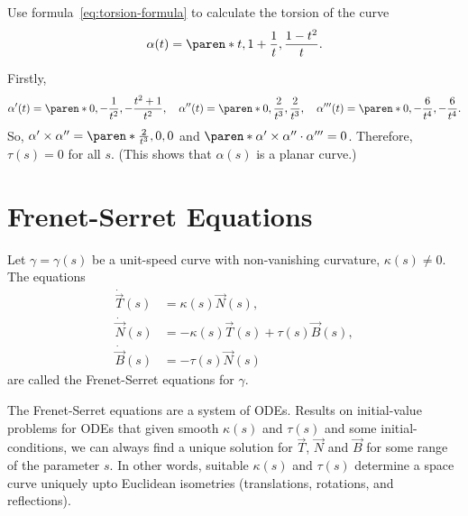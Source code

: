 \documentclass[11pt]{penrose}
\newcommand{\vT}{\vec{T}}
\newcommand{\vN}{\vec{N}}
\newcommand{\vB}{\vec{B}}
\newcommand{\keyword}[1]{\textsf{#1}}
\begin{document}
\begin{negg}
    Use formula~\eqref{eq:torsion-formula} to calculate the torsion of the curve
    \begin{equation}
        \alpha(t)
        = \paren*{ t, 1 + \frac{1}{t}, \frac{1 - t^2}{t} }.
    \end{equation}

    Firstly,
    \begin{equation}
        \alpha'(t) = \paren*{0, -\frac{1}{t^2}, -\frac{t^2 + 1}{t^2}}, \quad
        \alpha''(t) = \paren*{0, \frac{2}{t^3}, \frac{2}{t^3}}, \quad
        \alpha'''(t) = \paren*{0, -\frac{6}{t^4}, -\frac{6}{t^4}}.
    \end{equation}
    So, $\alpha' \times \alpha'' = \paren*{\frac{2}{t^3}, 0, 0}$ and $\paren*{\alpha' \times \alpha''} \cdot \alpha''' = 0$. Therefore, $\tau(s) = 0$ for all $s$. (This shows that $\alpha(s)$ is a planar curve.)
\end{negg}


\section{Frenet-Serret Equations}

\begin{ndfn}
    Let $\gamma = \gamma(s)$ be a unit-speed curve with non-vanishing curvature, $\kappa(s) \neq 0$. The equations
    \begin{align}
        \dot{\vT}(s) &= \kappa(s) \vN(s),\\
        \dot{\vN}(s) &= -\kappa(s) \vT(s) + \tau(s) \vB(s),\\
        \dot{\vB}(s) &= -\tau(s) \vN(s)
    \end{align}
    are called the \keyword{Frenet-Serret equations} for $\gamma$.
\end{ndfn}

The Frenet-Serret equations are a system of ODEs. Results on initial-value problems for ODEs that given smooth $\kappa(s)$ and $\tau(s)$ and some initial-conditions, we can always find a unique solution for $\vT$, $\vN$ and $\vB$ for some range of the parameter $s$. In other words, suitable $\kappa(s)$ and $\tau(s)$ determine a space curve uniquely upto Euclidean isometries (translations, rotations, and reflections).
\end{document}
